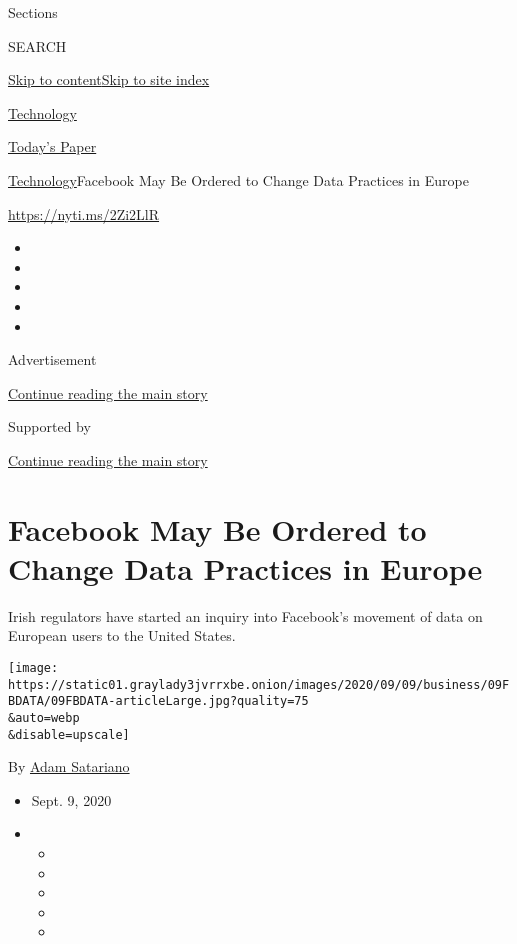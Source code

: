Sections

SEARCH

\protect\hyperlink{site-content}{Skip to
content}\protect\hyperlink{site-index}{Skip to site index}

\href{https://www.nytimes3xbfgragh.onion/section/technology}{Technology}

\href{https://myaccount.nytimes3xbfgragh.onion/auth/login?response_type=cookie\&client_id=vi}{}

\href{https://www.nytimes3xbfgragh.onion/section/todayspaper}{Today's
Paper}

\href{/section/technology}{Technology}\textbar{}Facebook May Be Ordered
to Change Data Practices in Europe

\url{https://nyti.ms/2Zi2LlR}

\begin{itemize}
\item
\item
\item
\item
\item
\end{itemize}

Advertisement

\protect\hyperlink{after-top}{Continue reading the main story}

Supported by

\protect\hyperlink{after-sponsor}{Continue reading the main story}

\hypertarget{facebook-may-be-ordered-to-change-data-practices-in-europe}{%
\section{Facebook May Be Ordered to Change Data Practices in
Europe}\label{facebook-may-be-ordered-to-change-data-practices-in-europe}}

Irish regulators have started an inquiry into Facebook's movement of
data on European users to the United States.

\texttt{[image: https://static01.graylady3jvrrxbe.onion/images/2020/09/09/business/09FBDATA/09FBDATA-articleLarge.jpg?quality=75\\\&auto=webp\\\&disable=upscale]}

By \href{https://www.nytimes3xbfgragh.onion/by/adam-satariano}{Adam
Satariano}

\begin{itemize}
\item
  Sept. 9, 2020
\item
  \begin{itemize}
  \item
  \item
  \item
  \item
  \item
  \end{itemize}
\end{itemize}

